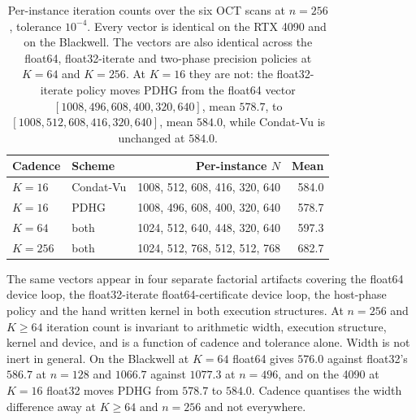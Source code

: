 \begin{table}[t]
\centering
\caption{Per-instance iteration counts over the six OCT scans at $n=256$,
tolerance $10^{-4}$. Every vector is identical on the RTX 4090 and on the
Blackwell. The vectors are also identical across the float64, float32-iterate
and two-phase precision policies at $K=64$ and $K=256$. At $K=16$ they are not:
the float32-iterate policy moves PDHG from the float64 vector
$[1008, 496, 608, 400, 320, 640]$, mean $578.7$, to
$[1008, 512, 608, 416, 320, 640]$, mean $584.0$, while Condat-Vu is unchanged
at $584.0$.}
\label{tab:Nvectors}
\begin{tabular}{@{}llrr@{}}
\toprule
Cadence & Scheme & Per-instance $N$ & Mean \\
\midrule
$K=16$  & Condat-Vu & 1008, 512, 608, 416, 320, 640 & 584.0 \\
$K=16$  & PDHG      & 1008, 496, 608, 400, 320, 640 & 578.7 \\
$K=64$  & both      & 1024, 512, 640, 448, 320, 640 & 597.3 \\
$K=256$ & both      & 1024, 512, 768, 512, 512, 768 & 682.7 \\
\bottomrule
\end{tabular}
\end{table}

The same vectors appear in four separate factorial artifacts covering the
float64 device loop, the float32-iterate float64-certificate device loop, the
host-phase policy and the hand written kernel in both execution structures. At
$n=256$ and $K \geq 64$ iteration count is invariant to arithmetic width,
execution structure, kernel and device, and is a function
of cadence and tolerance alone. Width is not inert in general. On the Blackwell
at $K=64$ float64 gives $576.0$ against float32's $586.7$ at $n=128$ and
$1066.7$ against $1077.3$ at $n=496$, and on the 4090 at $K=16$ float32 moves
PDHG from $578.7$ to $584.0$. Cadence quantises the width difference away at
$K \geq 64$ and $n=256$ and not everywhere.

